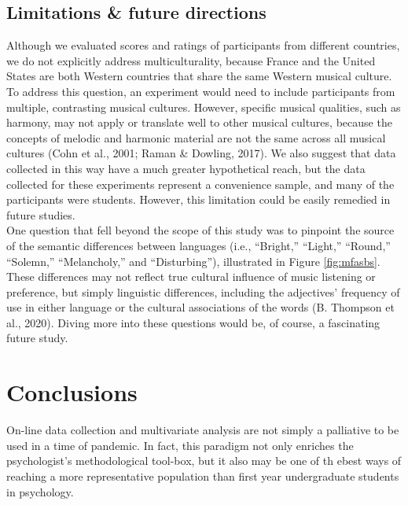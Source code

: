 \documentclass[
  english,
  man,floatsintext]{apa6}
\begin{document}
\hypertarget{limitations-future-directions}{%
\subsection{Limitations \& future directions}\label{limitations-future-directions}}

Although we evaluated scores and ratings of participants from different countries, we do not explicitly address multiculturality, because France and the United States are both Western countries that share the same Western musical culture. To address this question, an experiment would need to include participants from multiple, contrasting musical cultures. However, specific musical qualities, such as harmony, may not apply or translate well to other musical cultures, because the concepts of melodic and harmonic material are not the same across all musical cultures (Cohn et al., 2001; Raman \& Dowling, 2017). We also suggest that data collected in this way have a much greater hypothetical reach, but the data collected for these experiments represent a convenience sample, and many of the participants were students. However, this limitation could be easily remedied in future studies.\\
One question that fell beyond the scope of this study was to pinpoint the source of the semantic differences between languages (i.e., ``Bright,'' ``Light,'' ``Round,'' ``Solemn,'' ``Melancholy,'' and ``Disturbing''), illustrated in Figure \ref{fig:mfasbs}. These differences may not reflect true cultural influence of music listening or preference, but simply linguistic differences, including the adjectives' frequency of use in either language or the cultural associations of the words (B. Thompson et al., 2020). Diving more into these questions would be, of course, a fascinating future study.

\hypertarget{conclusions}{%
\section{Conclusions}\label{conclusions}}

On-line data collection and multivariate analysis are not simply a palliative to be used in a time of pandemic. In fact, this paradigm not only enriches the psychologist's methodological tool-box, but it also may be one of th ebest ways of reaching a more representative population than first year undergraduate students in psychology.

\newpage
\end{document}
